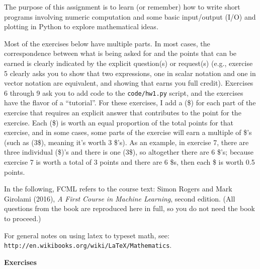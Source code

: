 \documentclass[10pt]{article}
\begin{document}
The purpose of this assignment is to learn (or remember) how to write short programs involving numeric computation and some basic input/output (I/O) and plotting in Python to explore mathematical ideas. 

Most of the exercises below have multiple parts.  In most cases, the correspondence between what is being asked for and the points that can be earned is clearly indicated by the explicit question(s) or request(s) (e.g., exercise 5 clearly asks you to show that two expressions, one in scalar notation and one in vector notation are equivalent, and showing that earns you full credit). Exercises 6 through 9 ask you to add code to the {\tt code/hw1.py} script, and the exercises have the flavor of a ``tutorial''. For these exercises, I add a (\$) for each part of the exercise that requires an explicit answer that contributes to the point for the exercise. Each (\$) is worth an equal proportion of the total points for that exercise, and in some cases, some parts of the exercise will earn a multiple of \$'s (such as (3\$), meaning it's worth 3 \$'s). As an example, in exercise 7, there are three individual (\$)'s and there is one (3\$), so altogether there are 6 \$'s; because exercise 7 is worth a total of 3 points and there are 6 \$s, then each \$ is worth 0.5 points.

In the following, FCML refers to the course text: Simon Rogers and Mark Girolami (2016), {\em A First Course in Machine Learning}, second edition.  (All questions from the book are reproduced here in full, so you do not need the book to proceed.)

For general notes on using latex to typeset math, see: {\tt http://en.wikibooks.org/wiki/LaTeX/Mathematics}.

\vspace{.5cm}

{\Large {\bf Exercises}}

\vspace{.5cm}

\end{document}
